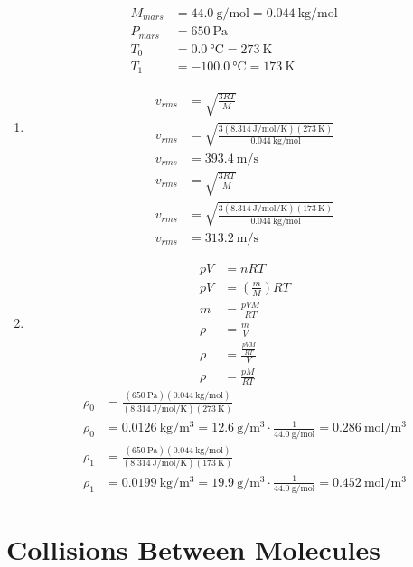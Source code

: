 \documentclass{article}
\begin{document}
\begin{align*}
	M_{mars} & = \SI{44.0}{\gram \per \mole} = \SI{0.044}{\kilogram \per \mole} \\
	P_{mars} & = \SI{650}{\pascal} \\
	T_0 & = \SI{0.0}{\celsius} = \SI{273}{\kelvin} \\
	T_1 & = \SI{-100.0}{\celsius} = \SI{173}{\kelvin}
\end{align*}
\begin{enumerate}[label = \textbf{(\alph*)}]
	\item
		\begin{align*}
			v_{rms} & = \sqrt{ \frac{ 3RT }{ M } } \\
			v_{rms} & = \sqrt{ \frac{ 3(\SI{8.314}{\joule \per \mole \per \kelvin})(\SI{273}{\kelvin}) }{ \SI{0.044}{\kilogram \per \mole} } } \\
			v_{rms} & = \SI{393.4}{\meter \per \second}
		\end{align*}
		\begin{align*}
			v_{rms} & = \sqrt{ \frac{ 3RT }{ M } } \\
			v_{rms} & = \sqrt{ \frac{ 3(\SI{8.314}{\joule \per \mole \per \kelvin})(\SI{173}{\kelvin}) }{ \SI{0.044}{\kilogram \per \mole} } } \\
			v_{rms} & = \SI{313.2}{\meter \per \second}
		\end{align*}
	\item
		\begin{align*}
			pV & = nRT \\
			pV & = \left( \frac{ m }{ M } \right) RT \\
			m & = \frac{ pVM }{ RT } \\
			\rho & = \frac{ m }{ V } \\
			\rho & = \frac{ \frac{ pVM }{ RT } }{ V } \\
			\rho & = \frac{ pM }{ RT }
		\end{align*}
		\begin{align*}
			\rho_0 & = \frac{ (\SI{650}{\pascal})(\SI{0.044}{\kilogram \per \mole}) }{ (\SI{8.314}{\joule \per \mole \per \kelvin})(\SI{273}{\kelvin}) } \\
			\rho_0 & = \SI{0.0126}{\kilogram \per \meter \cubed} = \SI{12.6}{\gram \per \meter \cubed} \cdot \frac{ 1 }{ \SI{44.0}{\gram \per \mole} } = \SI{0.286}{\mole \per \meter \cubed}
		\end{align*}
		\begin{align*}
			\rho_1 & = \frac{ (\SI{650}{\pascal})(\SI{0.044}{\kilogram \per \mole}) }{ (\SI{8.314}{\joule \per \mole \per \kelvin})(\SI{173}{\kelvin}) } \\
			\rho_1 & = \SI{0.0199}{\kilogram \per \meter \cubed} = \SI{19.9}{\gram \per \meter \cubed} \cdot \frac{ 1 }{ \SI{44.0}{\gram \per \mole} } = \SI{0.452}{\mole \per \meter \cubed}
		\end{align*}
\end{enumerate}

\section{Collisions Between Molecules}
\end{document}
